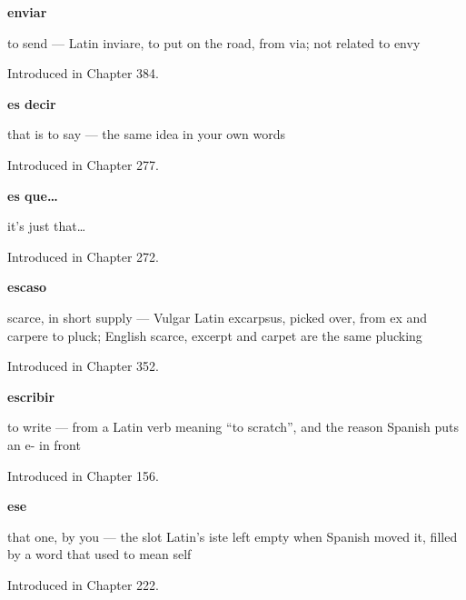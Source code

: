 \noindent\begin{minipage}[t]{\linewidth}
\raggedright
\textbf{enviar}\par
\small to send — Latin inviare, to put on the road, from via; not related to envy\par
\footnotesize Introduced in Chapter 384.
\end{minipage}\par\medskip

\noindent\begin{minipage}[t]{\linewidth}
\raggedright
\textbf{es decir}\par
\small that is to say — the same idea in your own words\par
\footnotesize Introduced in Chapter 277.
\end{minipage}\par\medskip

\noindent\begin{minipage}[t]{\linewidth}
\raggedright
\textbf{es que…}\par
\small it's just that…\par
\footnotesize Introduced in Chapter 272.
\end{minipage}\par\medskip

\noindent\begin{minipage}[t]{\linewidth}
\raggedright
\textbf{escaso}\par
\small scarce, in short supply — Vulgar Latin excarpsus, picked over, from ex and carpere to pluck; English scarce, excerpt and carpet are the same plucking\par
\footnotesize Introduced in Chapter 352.
\end{minipage}\par\medskip

\noindent\begin{minipage}[t]{\linewidth}
\raggedright
\textbf{escribir}\par
\small to write — from a Latin verb meaning \textquotedblleft{}to scratch\textquotedblright{}, and the reason Spanish puts an e- in front\par
\footnotesize Introduced in Chapter 156.
\end{minipage}\par\medskip

\noindent\begin{minipage}[t]{\linewidth}
\raggedright
\textbf{ese}\par
\small that one, by you — the slot Latin's iste left empty when Spanish moved it, filled by a word that used to mean self\par
\footnotesize Introduced in Chapter 222.
\end{minipage}\par\medskip

